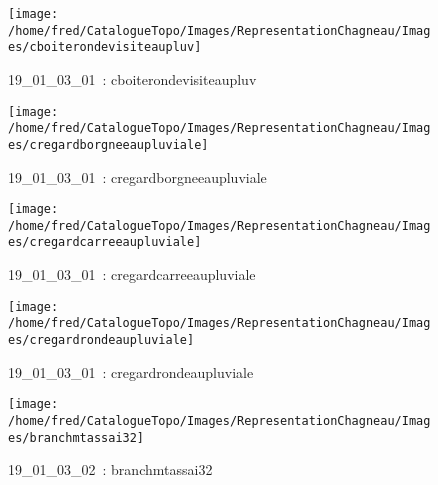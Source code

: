\documentclass[12pt,titlepage]{book}
\begin{document}
\begin{figure}[h!]
  \hfill         %
  \begin{minipage}[t]{3cm}
    \begin{center}
      \texttt{[image: /home/fred/CatalogueTopo/Images/RepresentationChagneau/Images/cboiterondevisiteaupluv]}
      \caption[~19\_01\_03\_01]{\small{19\_01\_03\_01~:} \tiny{cboiterondevisiteaupluv}}\label{cboiterondevisiteaupluv}
    \end{center}
  \end{minipage}
  \begin{minipage}[t]{3cm}
    \begin{center}
      \texttt{[image: /home/fred/CatalogueTopo/Images/RepresentationChagneau/Images/cregardborgneeaupluviale]}
      \caption[~19\_01\_03\_01]{\small{19\_01\_03\_01~:} \tiny{cregardborgneeaupluviale}}\label{cregardborgneeaupluviale}
    \end{center}
  \end{minipage}
  \begin{minipage}[t]{3cm}
    \begin{center}
      \texttt{[image: /home/fred/CatalogueTopo/Images/RepresentationChagneau/Images/cregardcarreeaupluviale]}
      \caption[~19\_01\_03\_01]{\small{19\_01\_03\_01~:} \tiny{cregardcarreeaupluviale}}\label{cregardcarreeaupluviale}
    \end{center}
  \end{minipage}
  \begin{minipage}[t]{3cm}
    \begin{center}
      \texttt{[image: /home/fred/CatalogueTopo/Images/RepresentationChagneau/Images/cregardrondeaupluviale]}
      \caption[~19\_01\_03\_01]{\small{19\_01\_03\_01~:} \tiny{cregardrondeaupluviale}}\label{cregardrondeaupluviale}
    \end{center}
  \end{minipage}
  \begin{minipage}[t]{3cm}
    \begin{center}
      \texttt{[image: /home/fred/CatalogueTopo/Images/RepresentationChagneau/Images/branchmtassai32]}
      \caption[~19\_01\_03\_02]{\small{19\_01\_03\_02~:} \tiny{branchmtassai32}}\label{branchmtassai32}

\end{center}
\end{minipage}
\end{figure}
\end{document}
